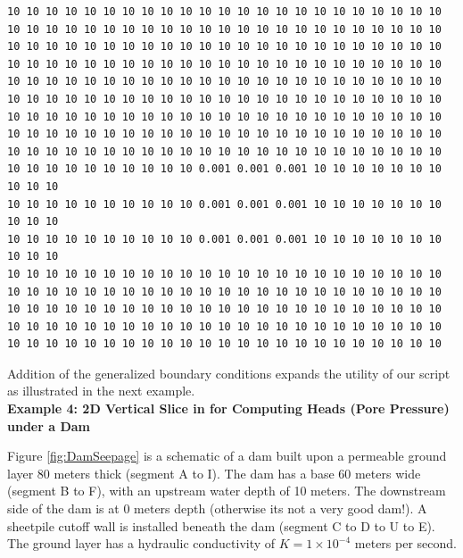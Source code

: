 \begin{lstlisting}
10 10 10 10 10 10 10 10 10 10 10 10 10 10 10 10 10 10 10 10 10 10 10
10 10 10 10 10 10 10 10 10 10 10 10 10 10 10 10 10 10 10 10 10 10 10
10 10 10 10 10 10 10 10 10 10 10 10 10 10 10 10 10 10 10 10 10 10 10
10 10 10 10 10 10 10 10 10 10 10 10 10 10 10 10 10 10 10 10 10 10 10
10 10 10 10 10 10 10 10 10 10 10 10 10 10 10 10 10 10 10 10 10 10 10
10 10 10 10 10 10 10 10 10 10 10 10 10 10 10 10 10 10 10 10 10 10 10
10 10 10 10 10 10 10 10 10 10 10 10 10 10 10 10 10 10 10 10 10 10 10
10 10 10 10 10 10 10 10 10 10 10 10 10 10 10 10 10 10 10 10 10 10 10
10 10 10 10 10 10 10 10 10 10 10 10 10 10 10 10 10 10 10 10 10 10 10
10 10 10 10 10 10 10 10 10 10 0.001 0.001 0.001 10 10 10 10 10 10 10 10 10 10
10 10 10 10 10 10 10 10 10 10 0.001 0.001 0.001 10 10 10 10 10 10 10 10 10 10
10 10 10 10 10 10 10 10 10 10 0.001 0.001 0.001 10 10 10 10 10 10 10 10 10 10
10 10 10 10 10 10 10 10 10 10 10 10 10 10 10 10 10 10 10 10 10 10 10
10 10 10 10 10 10 10 10 10 10 10 10 10 10 10 10 10 10 10 10 10 10 10
10 10 10 10 10 10 10 10 10 10 10 10 10 10 10 10 10 10 10 10 10 10 10
10 10 10 10 10 10 10 10 10 10 10 10 10 10 10 10 10 10 10 10 10 10 10
10 10 10 10 10 10 10 10 10 10 10 10 10 10 10 10 10 10 10 10 10 10 10
\end{lstlisting}

Addition of the generalized boundary conditions expands the utility of our script as illustrated in the next example.\\

\textbf{Example 4: 2D Vertical Slice in for Computing Heads (Pore Pressure) under a Dam}

Figure \ref{fig:DamSeepage} is a schematic of a dam built upon a permeable ground layer 80 meters thick (segment A to I).  
The dam has a base 60 meters wide (segment B to F), with an upstream water depth of 10 meters.
The downstream side of the dam is at 0 meters depth (otherwise its not a very good dam!).  
A sheetpile cutoff wall is installed beneath the dam (segment C to D to U to E).   
The ground layer has a hydraulic conductivity of $K = 1 \times 10^{-4}$ meters per second.

